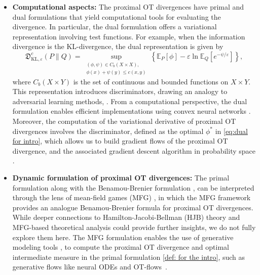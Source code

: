 \documentclass{amsart}
\newcommand{\rb}[1]{#1} %
\theoremstyle{definition}
\theoremstyle{remark}
\numberwithin{equation}{section}
\begin{document}
\begin{itemize}
\medskip
\item {\bf Computational aspects:} \rb{The proximal OT divergences have primal and dual formulations that yield computational tools for evaluating the divergence. In particular, the dual formulation offers a variational representation involving test functions.} For example, when the information divergence is the KL-divergence, the dual representation is given by
\begin{equation}\label{eq:dual for intro}
\mathfrak{D}_{\mathrm{KL},\varepsilon}^{c}(P\|Q)= 
\sup_{\substack{(\phi, \psi) \in C_b(X\times X),\\ \phi(x)+\psi(y)\leq c(x,y)}}
\left\{ \mathbb{E}_P[\phi]  -\varepsilon \ln \mathbb{E}_Q[e^{-\psi/\varepsilon}]\right\},
\end{equation}
where $C_b(X\times Y)$ is the set of continuous and bounded functions on $X\times Y$. This representation introduces discriminators, drawing an analogy to adversarial learning methods, \cite{goodfellow2014generative,f-GAN,Wasserstein:GAN}. From a computational perspective, the dual formulation enables efficient implementations using convex neural networks \cite{bengio2005convex}. Moreover, the computation of the variational derivative of proximal OT divergences  involves the discriminator, defined as the optimal $\phi^*$ in \eqref{eq:dual for intro}, which allows us to build gradient flows of the proximal OT divergence, and the associated gradient descent algorithm in probability space \cite{glaser2021kale, Gu_GPA, chen2024learning}.
\medskip
\item {\bf Dynamic formulation of proximal OT divergences:} The primal formulation along with the Benamou-Brenier formulation \cite{Benamou2000}, can be interpreted through the lens of mean-field games (MFG) \cite{lasry2007mean}, in which the MFG framework provides an analogue Benamou-Brenier formula for proximal OT divergences. While deeper connections to Hamilton-Jacobi-Bellman (HJB) theory and MFG-based theoretical analysis could provide further insights, we do not fully explore them here. The MFG formulation enables the use of generative modeling tools \cite{zhang2023mean},  to compute the proximal OT divergence and optimal intermediate measure in the primal formulation \eqref{def: for the intro}, such as generative flows like neural ODEs \cite{NEURALODE} and  OT-flows~\cite{onken2021ot}.
\end{itemize}
\end{document}
